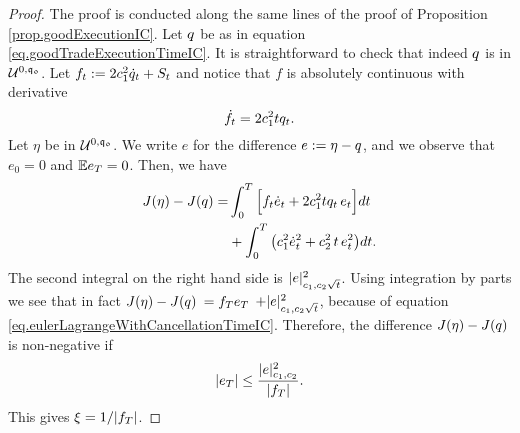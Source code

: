 \documentclass[10pt,a4paper]{article}
\begin{document}
\begin{proof}
The proof is conducted along the same lines of the proof of Proposition \ref{prop.goodExecutionIC}.
Let $q$ be as in equation \eqref{eq.goodTradeExecutionTimeIC}. It is straightforward to check that indeed $q$ is in $\mathcal{U}^{0,\mathfrak{q_0}}$. 
 Let $f_t:= 2c_{1}^{2} \dot{q}_{t} + S_t$ and notice that $f$ is absolutely continuous with derivative 
\begin{equation}\label{eq.eulerLagrangeWithCancellationTimeIC}
\dot{f}_t = 2 c_{1}^{2} t q_t .
\end{equation}
Let $\eta$ be in $\mathcal{U}^{0,\mathfrak{q_0}}$. We write $e$ for the difference $e:=\eta-q$, and we observe that $e_0=0$ and $\mathbb{{E}} e_T = 0$.  Then, we have 
\begin{equation*}
\begin{split}
J(\eta) - J(q) = &
\int_{0}^{T} \Big[ f_t \dot{e}_t + 2c_{1}^{2} t q_t \, e_t\Big]dt\\
&+\int_{0}^{T}\big(c_{1}^{2} \dot{e}_t^{2} + c_{2}^{2} \, t \, e^{2}_t \big)dt.
\end{split}
\end{equation*}
The second integral on the right hand side is $ \lvert e \rvert_{c_{1},c_{2}\sqrt{t}}^{2}$.  
Using integration by parts we see that in fact $J(\eta) - J(q) $ $= f_T e_T $ $ + \lvert e \rvert_{c_{1},c_{2}\sqrt{t}}^{2}$, because of equation \eqref{eq.eulerLagrangeWithCancellationTimeIC}.  
Therefore, the difference $J(\eta) - J(q) $ is non-negative if 
\begin{equation*}
\left\lvert {e_T} \right\rvert
\leq \frac{ \lvert e \rvert_{c_{1},c_{2}}^{2}}{\left\lvert {f_T} \right\rvert}.
\end{equation*}
This gives $\xi = 1/\lvert f_T\rvert$.


\end{proof}
\end{document}
